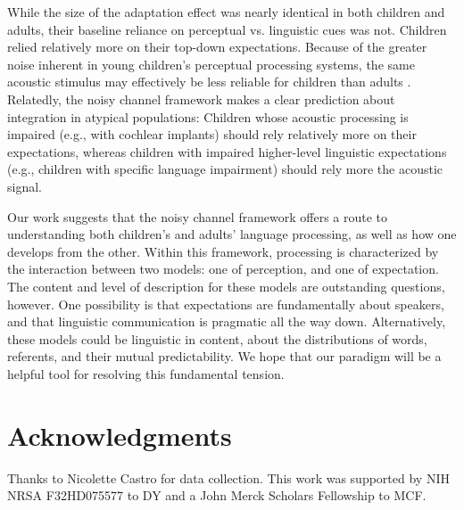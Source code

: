 \documentclass[man,floatsintext]{apa6}
\begin{document}
While the size of the adaptation effect was nearly identical in both children and adults, their baseline reliance on perceptual vs. linguistic cues was not. Children relied relatively more on their top-down expectations. Because of the greater noise inherent in young children's perceptual processing systems, the same acoustic stimulus may effectively be less reliable for children than adults \cite{neuman1983, lyons2011}. Relatedly, the noisy channel framework makes a clear prediction about integration in atypical populations: Children whose acoustic processing is impaired (e.g., with cochlear implants) should rely relatively more on their expectations, whereas children with impaired higher-level linguistic expectations (e.g., children with specific language impairment) should rely more the acoustic signal.


Our work suggests that the noisy channel framework offers a route to understanding both children's and adults' language processing, as well as how one develops from the other. Within this framework, processing is characterized by the interaction between two models: one of perception, and one of expectation. The content and level of description for these models are outstanding questions, however. One possibility is that expectations are fundamentally about speakers, and that linguistic communication is pragmatic all the way down. Alternatively, these models could be linguistic in content, about the distributions of words, referents, and their mutual predictability. We hope that our paradigm will be a helpful tool for resolving this fundamental tension. 

\section{Acknowledgments}

Thanks to Nicolette Castro for data collection. This work was supported by NIH NRSA F32HD075577 to DY and a John Merck Scholars Fellowship to MCF.



\end{document}

